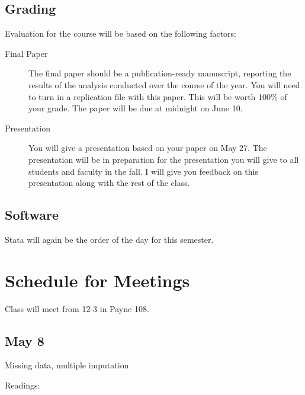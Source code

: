 \documentclass[10pt]{article}
\begin{document}
\subsection{Grading}%
\begin{flushleft}
Evaluation for the course will be based on the following factors:

\begin{description}
\item[Final Paper] The final paper should be a publication-ready
  manuscript, reporting the results of the analysis conducted over the
  course of the year. You will need to turn in a replication file with
  this paper. This will be worth 100\% of your grade. The paper will
  be due at midnight on June 10. 


\item[Presentation] You will give a presentation based on your paper
  on May 27.  The presentation will be in preparation for the
  presentation you will give to all students and faculty in the
  fall. I will give you feedback on this presentation along with the
  rest of the class. 

\end{description}


\end{flushleft}
\subsection{Software}

Stata will again be the order of the day for this semester. 

\section{Schedule for Meetings}

Class will meet from 12-3 in Payne 108.  



\subsection{May 8}

Missing data, multiple imputation

Readings:

\begin{description}

\item {}

\item {}

\item {}
  
\end{description}
\end{document}
